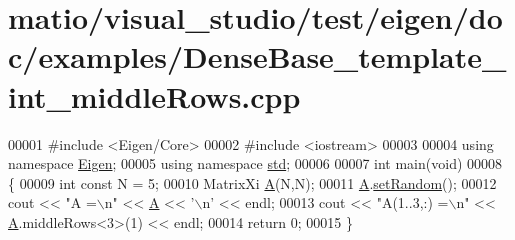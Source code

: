 \hypertarget{matio_2visual__studio_2test_2eigen_2doc_2examples_2_dense_base__template__int__middle_rows_8cpp_source}{}\section{matio/visual\+\_\+studio/test/eigen/doc/examples/\+Dense\+Base\+\_\+template\+\_\+int\+\_\+middle\+Rows.cpp}
\label{matio_2visual__studio_2test_2eigen_2doc_2examples_2_dense_base__template__int__middle_rows_8cpp_source}

\begin{DoxyCode}
00001 \textcolor{preprocessor}{#include <Eigen/Core>}
00002 \textcolor{preprocessor}{#include <iostream>}
00003 
00004 \textcolor{keyword}{using namespace }\hyperlink{namespace_eigen}{Eigen};
00005 \textcolor{keyword}{using namespace }\hyperlink{namespacestd}{std};
00006 
00007 \textcolor{keywordtype}{int} main(\textcolor{keywordtype}{void})
00008 \{
00009     \textcolor{keywordtype}{int} \textcolor{keyword}{const} N = 5;
00010     MatrixXi \hyperlink{group___core___module_class_eigen_1_1_matrix}{A}(N,N);
00011     \hyperlink{group___core___module_class_eigen_1_1_matrix}{A}.\hyperlink{class_eigen_1_1_plain_object_base_af0e576a0e1aefc9ee346de44cc352ba3}{setRandom}();
00012     cout << \textcolor{stringliteral}{"A =\(\backslash\)n"} << \hyperlink{group___core___module_class_eigen_1_1_matrix}{A} << \textcolor{charliteral}{'\(\backslash\)n'} << endl;
00013     cout << \textcolor{stringliteral}{"A(1..3,:) =\(\backslash\)n"} << \hyperlink{group___core___module_class_eigen_1_1_matrix}{A}.middleRows<3>(1) << endl;
00014     \textcolor{keywordflow}{return} 0;
00015 \}
\end{DoxyCode}
